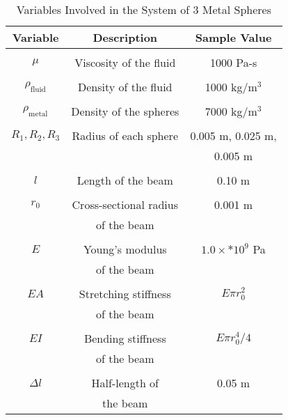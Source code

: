 \documentclass[letterpaper, 10 pt, conference]{ieeeconf}  %
\begin{document}
\begin{table}[h]
\caption{Variables Involved in the System of 3 Metal Spheres}
\label{table_variables}
\begin{center}
\begin{tabular}{|c|c|c|}
\hline
Variable & Description & Sample Value \\
\hline
& & \\ $\mu$ & Viscosity of the fluid & 1000 Pa-s \\
& & \\ $\rho_{ \text{fluid} }$ & Density of the fluid & 1000 kg/m\(^3\) \\
& & \\ $\rho_{\text{metal}}$ & Density of the spheres & 7000 kg/m\(^3\) \\
& & \\ $R_1, R_2, R_3$ & Radius of each sphere & 0.005 m, 0.025 m, \\ & & 0.005 m \\
& & \\ $l$ & Length of the beam & 0.10 m \\
& & \\ $r_0$ & Cross-sectional radius  & 0.001 m \\ & of the beam & \\
& & \\ $E$ & Young's modulus & $1.0 \times * 10^{9}$ Pa \\ & of the beam & \\
& & \\ $EA$ & Stretching stiffness & $E\pi r_0^2$  \\ & of the beam & \\
& & \\ $EI$ & Bending stiffness & $E\pi r_0^4 / 4$  \\ & of the beam & \\
& & \\ $\Delta l$ & Half-length of & 0.05 m \\ & the beam & \\


\end{tabular}
\end{center}
\end{table}
\end{document}
